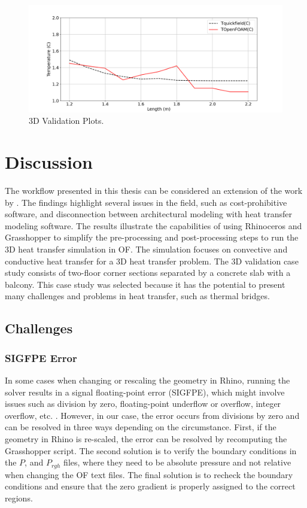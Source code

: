 \begin{figure}[htb] 
\centering
\includegraphics[width=1\columnwidth]{Figures/valpl2.png}
\hspace{0.7cm}
\caption{3D Validation Plots.}
\label{fig:validation-plots}
\end{figure}





\afterpage{\clearpage}
\section{Discussion}


The workflow presented in this thesis can be considered an extension of the work by \citeauthor{kastner2020solving} \cite{kastner2020solving}. 
The findings highlight several issues in the field, such as cost-prohibitive software, and disconnection between architectural modeling with heat transfer modeling software. 
The results illustrate the capabilities of using Rhinoceros and Grasshopper to simplify the pre-processing and post-processing steps to run the 3D heat transfer simulation in \gls{OF}. 
The simulation focuses on convective and conductive heat transfer for a 3D heat transfer problem. The 3D validation case study consists of two-floor corner sections separated by a concrete slab with a balcony. This case study was selected because it has the potential to present many challenges and problems in heat transfer, such as thermal bridges.


\subsection{Challenges}
\subsubsection{SIGFPE Error}
In some cases when changing or rescaling the geometry in Rhino, running the solver results in a signal floating-point error (SIGFPE), which might involve issues such as division by zero, floating-point underflow or overflow, integer overflow, etc. \cite{sigfpe}. However, in our case, the error occurs from divisions by zero and can be resolved in three ways depending on the circumstance. First, if the geometry in Rhino is re-scaled, the error can be resolved by recomputing the Grasshopper script. The second solution is to verify the boundary conditions in the $P$, and $P_{rgh}$ files, where they need to be absolute pressure and not relative when changing the \gls{OF} text files. The final solution is to recheck the boundary conditions and ensure that the zero gradient is properly assigned to the correct regions.



